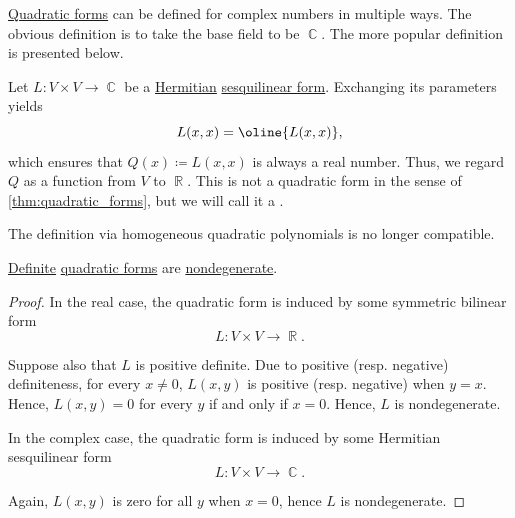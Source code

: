 \begin{remark}\label{rem:complex_quadratic_form}
  \hyperref[thm:quadratic_forms]{Quadratic forms} can be defined for complex numbers in multiple ways. The obvious definition is to take the base field to be \( \BbbC \). The more popular definition is presented below.

  Let \( L: V \times V \to \BbbC \) be a \hyperref[def:hermitian_form]{Hermitian} \hyperref[def:sesquilinear_form]{sesquilinear form}. Exchanging its parameters yields
  \begin{equation*}
    L(x, x) = \oline {L(x, x)},
  \end{equation*}
  which ensures that \( Q(x) \coloneqq L(x, x) \) is always a real number. Thus, we regard \( Q \) as a function from \( V \) to \( \BbbR \). This is not a quadratic form in the sense of \cref{thm:quadratic_forms}, but we will call it a .

  The definition via homogeneous quadratic polynomials is no longer compatible.
\end{remark}

\begin{proposition}\label{thm:quadratic_forms_are_nondegenerate}
  \hyperref[def:real_function_definiteness]{Definite} \hyperref[thm:quadratic_forms]{quadratic forms} are \hyperref[def:degenerate_bilinear_form]{nondegenerate}.
\end{proposition}
\begin{proof}
  In the real case, the quadratic form is induced by some symmetric bilinear form
  \begin{equation*}
    L: V \times V \to \BbbR.
  \end{equation*}

  Suppose also that \( L \) is positive definite. Due to positive (resp. negative) definiteness, for every \( x \neq 0 \), \( L(x, y) \) is positive (resp. negative) when \( y = x \). Hence, \( L(x, y) = 0 \) for every \( y \) if and only if \( x = 0 \). Hence, \( L \) is nondegenerate.

  In the complex case, the quadratic form is induced by some Hermitian sesquilinear form
  \begin{equation*}
    L: V \times V \to \BbbC.
  \end{equation*}

  Again, \( L(x, y) \) is zero for all \( y \) when \( x = 0 \), hence \( L \) is nondegenerate.
\end{proof}

